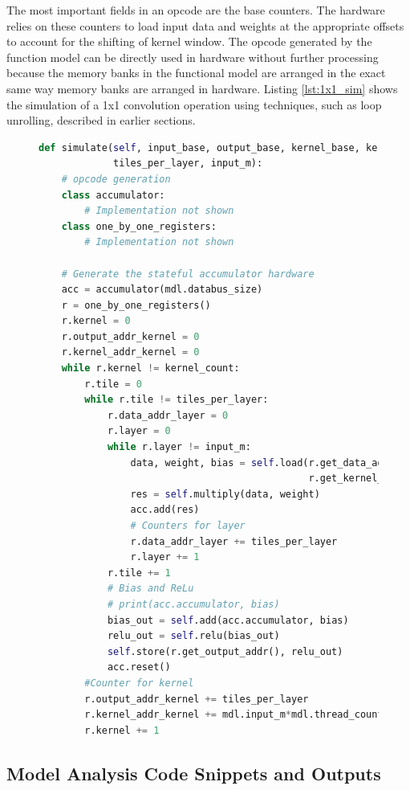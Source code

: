 \documentclass{uw-ece-wkrpt}
\begin{document}
The most important fields in an opcode are the base counters. The hardware relies on these counters to load input data and weights at the appropriate offsets to account for the shifting of \gls{kernel} window. The opcode generated by the function model can be directly used in hardware without further processing because the memory banks in the functional model are arranged in the exact same way memory banks are arranged in hardware. Listing \ref{lst:1x1_sim} shows the simulation of a 1x1 convolution operation using techniques, such as loop unrolling, described in earlier sections.

\begin{figure}
\centering
\begin{lstlisting}[caption={Simulation of 1x1 convolution in functional model}, label=lst:1x1_sim, language=Python]
def simulate(self, input_base, output_base, kernel_base, kernel_count,
             tiles_per_layer, input_m):
    # opcode generation
    class accumulator:
        # Implementation not shown
    class one_by_one_registers:
        # Implementation not shown

    # Generate the stateful accumulator hardware
    acc = accumulator(mdl.databus_size)
    r = one_by_one_registers()
    r.kernel = 0
    r.output_addr_kernel = 0
    r.kernel_addr_kernel = 0
    while r.kernel != kernel_count:
        r.tile = 0
        while r.tile != tiles_per_layer:
            r.data_addr_layer = 0
            r.layer = 0
            while r.layer != input_m:
                data, weight, bias = self.load(r.get_data_addr(),
                                               r.get_kernel_addr())
                res = self.multiply(data, weight)
                acc.add(res)
                # Counters for layer
                r.data_addr_layer += tiles_per_layer
                r.layer += 1
            r.tile += 1
            # Bias and ReLu
            # print(acc.accumulator, bias)
            bias_out = self.add(acc.accumulator, bias)
            relu_out = self.relu(bias_out)
            self.store(r.get_output_addr(), relu_out)
            acc.reset()
        #Counter for kernel
        r.output_addr_kernel += tiles_per_layer
        r.kernel_addr_kernel += mdl.input_m*mdl.thread_count
        r.kernel += 1
\end{lstlisting}
\end{figure}

\subsection{Model Analysis Code Snippets and Outputs}
\end{document}
